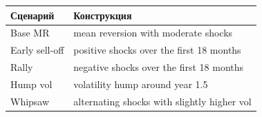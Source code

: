 \begin{tabular}{ll}
\toprule
Сценарий & Конструкция \\
\midrule
Base MR & mean reversion with moderate shocks \\
Early sell-off & positive shocks over the first 18 months \\
Rally & negative shocks over the first 18 months \\
Hump vol & volatility hump around year 1.5 \\
Whipsaw & alternating shocks with slightly higher vol \\
\bottomrule
\end{tabular}
